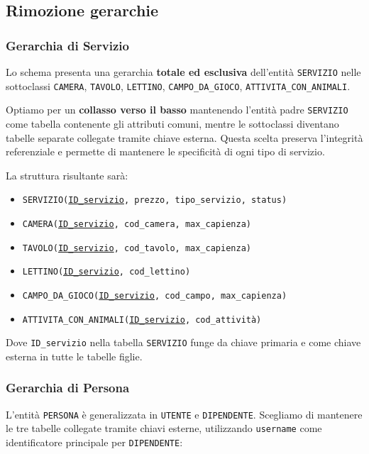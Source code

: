 \documentclass[a4paper,12pt]{report}
\begin{document}
\subsection{Rimozione gerarchie}

\subsubsection*{Gerarchia di Servizio}
Lo schema presenta una gerarchia \textbf{totale ed esclusiva} dell'entità \texttt{SERVIZIO} nelle sottoclassi
\texttt{CAMERA}, \texttt{TAVOLO}, \texttt{LETTINO}, \texttt{CAMPO\_DA\_GIOCO}, \texttt{ATTIVITA\_CON\_ANIMALI}.

Optiamo per un \textbf{collasso verso il basso} mantenendo l'entità padre \texttt{SERVIZIO} come tabella contenente gli
attributi comuni, mentre le sottoclassi diventano tabelle separate collegate tramite chiave esterna. Questa scelta preserva
l'integrità referenziale e permette di mantenere le specificità di ogni tipo di servizio.

La struttura risultante sarà:
\begin{itemize}
	\item \texttt{SERVIZIO(\underline{ID\_servizio}, prezzo, tipo\_servizio, status)}
	\item \texttt{CAMERA(\underline{ID\_servizio}, cod\_camera, max\_capienza)}
	\item \texttt{TAVOLO(\underline{ID\_servizio}, cod\_tavolo, max\_capienza)}
	\item \texttt{LETTINO(\underline{ID\_servizio}, cod\_lettino)}
	\item \texttt{CAMPO\_DA\_GIOCO(\underline{ID\_servizio}, cod\_campo, max\_capienza)}
	\item \texttt{ATTIVITA\_CON\_ANIMALI(\underline{ID\_servizio}, cod\_attività)}
\end{itemize}

Dove \texttt{ID\_servizio} nella tabella \texttt{SERVIZIO} funge da chiave primaria e come chiave esterna in tutte le tabelle figlie.

\subsubsection*{Gerarchia di Persona}
L'entità \texttt{PERSONA} è generalizzata in \texttt{UTENTE} e \texttt{DIPENDENTE}. Scegliamo di mantenere le tre tabelle
collegate tramite chiavi esterne, utilizzando \texttt{username} come identificatore principale per \texttt{DIPENDENTE}:
\end{document}
